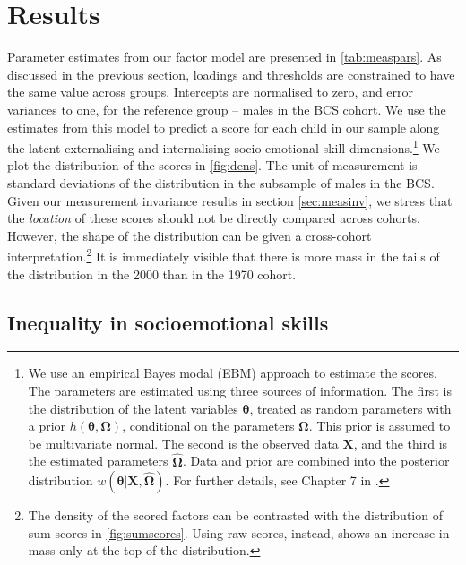 

\section{Results}\label{sec:results}

Parameter estimates from our factor model are presented in \autoref{tab:measpars}. As discussed in the previous section, loadings and thresholds are constrained to have the same value across groups. Intercepts are normalised to zero, and error variances to one, for the reference group -- males in the BCS cohort. We use the estimates from this model to predict a score for each child in our sample along the latent externalising and internalising socio-emotional skill dimensions.\footnote{We use an empirical Bayes modal (EBM) approach to estimate the scores. The parameters are estimated using three sources of information. The first is the distribution of the latent variables $\bm{\theta}$, treated as random parameters with a prior $h(\bm{\theta}, \bm{\Omega})$, conditional on the parameters $\bm{\Omega}$. This prior is assumed to be multivariate normal. The second is the observed data $\bm{X}$, and the third is the estimated parameters $\hat{\bm{\Omega}}$. Data and prior are combined into the posterior distribution $w(\bm{\theta}| \bm{X}, \hat{\bm{\Omega}})$. For further details, see Chapter 7 in \citet{Skrondal2004}.} We plot the distribution of the scores in \autoref{fig:dens}. The unit of measurement is standard deviations of the distribution in the subsample of males in the BCS. Given our measurement invariance results in section \ref{sec:measinv}, we stress that the \emph{location} of these scores should not be directly compared across cohorts. However, the shape of the distribution can be given a cross-cohort interpretation.\footnote{The density of the scored factors can be contrasted with the distribution of sum scores in \autoref{fig:sumscores}. Using raw scores, instead, shows an increase in mass only at the top of the distribution.} It is immediately visible that there is more mass in the tails of the distribution in the 2000 than in the 1970 cohort.

\subsection{Inequality in socioemotional skills}

